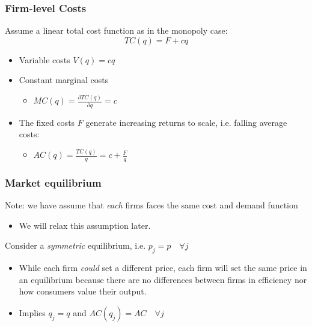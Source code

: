 \documentclass{beamer}
\begin{document}
\begin{frame}
	\frametitle{Firm-level Costs}
Assume a linear total cost function as in the monopoly case:
	\[ TC(q) = F + c q \]
		\begin{itemize}
			\item Variable costs $V(q)=cq$\vspace{2mm}
			\item Constant marginal costs 
			\begin{itemize}
				\item $MC(q) = \frac{\partial TC(q)}{\partial q} = c$ \vspace{3mm}
			\end{itemize}
			\item The fixed costs $F$ generate increasing returns to scale, i.e. falling average costs:
			\begin{itemize}
				\item $AC(q) = \frac{TC(q)}{q} = c + \frac{F}{q}$
			\end{itemize}
		\end{itemize}
\end{frame}

\begin{frame}

\frametitle{ Market equilibrium}

Note: we have assume that \emph{each} firms faces the same cost and demand function
	\begin{itemize}
		\item We will relax this assumption later.
	\end{itemize}

Consider a \emph{symmetric} equilibrium, i.e. $p_j=p \quad \forall j$
	\begin{itemize}
		\item While each firm \emph{could} set a different price, each firm will set the same price in an equilibrium because there are no differences between firms in efficiency nor how consumers value their output.
		\item Implies $q_j=q$ and $AC(q_j)=AC\quad \forall j$
	\end{itemize}


\end{frame}
\end{document}

